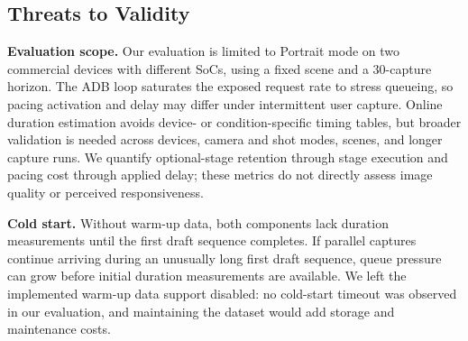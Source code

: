 \subsection{Threats to Validity}
\label{sec:threats}

\smallskip\noindent\textbf{Evaluation scope.}
Our evaluation is limited to Portrait mode on two commercial devices with different SoCs, using a fixed scene and a 30-capture horizon.
The ADB loop saturates the exposed request rate to stress queueing, so pacing activation and delay may differ under intermittent user capture.
Online duration estimation avoids device- or condition-specific timing tables, but broader validation is needed across devices, camera and shot modes, scenes, and longer capture runs.
We quantify optional-stage retention through stage execution and pacing cost through applied delay; these metrics do not directly assess image quality or perceived responsiveness.

\smallskip\noindent\textbf{Cold start.}
Without warm-up data, both components lack duration measurements until the first draft sequence completes.
If parallel captures continue arriving during an unusually long first draft sequence, queue pressure can grow before initial duration measurements are available.
We left the implemented warm-up data support disabled: no cold-start timeout was observed in our evaluation, and maintaining the dataset would add storage and maintenance costs.
